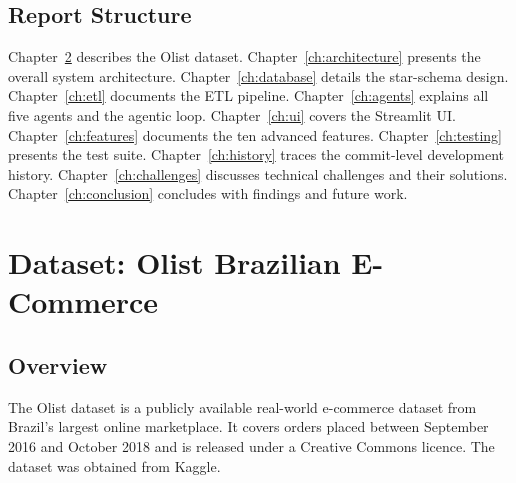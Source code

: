 \documentclass[12pt,a4paper]{report}
\begin{document}
\section{Report Structure}

Chapter~\ref{ch:dataset} describes the Olist dataset.
Chapter~\ref{ch:architecture} presents the overall system architecture.
Chapter~\ref{ch:database} details the star-schema design.
Chapter~\ref{ch:etl} documents the ETL pipeline.
Chapter~\ref{ch:agents} explains all five agents and the agentic loop.
Chapter~\ref{ch:ui} covers the Streamlit UI.
Chapter~\ref{ch:features} documents the ten advanced features.
Chapter~\ref{ch:testing} presents the test suite.
Chapter~\ref{ch:history} traces the commit-level development history.
Chapter~\ref{ch:challenges} discusses technical challenges and their solutions.
Chapter~\ref{ch:conclusion} concludes with findings and future work.

\chapter{Dataset: Olist Brazilian E-Commerce}
\label{ch:dataset}

\section{Overview}

The Olist dataset is a publicly available real-world e-commerce dataset from Brazil's largest
online marketplace. It covers orders placed between September 2016 and October 2018 and is
released under a Creative Commons licence. The dataset was obtained from Kaggle.
\end{document}
